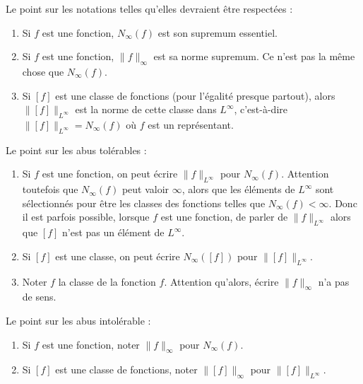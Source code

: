 \begin{normaltext}
    Le point sur les notations telles qu'elles devraient être respectées :
    \begin{enumerate}
        \item
            Si \( f\) est une fonction, \( N_{\infty}(f)\) est son supremum essentiel.
        \item
            Si \( f\) est une fonction, \( \| f \|_{\infty}\) est sa norme supremum. Ce n'est pas la même chose que \( N_{\infty}(f)\).
        \item
            Si \( [f]\) est une classe de fonctions (pour l'égalité presque partout), alors \( \| [f] \|_{L^{\infty}}\) est la norme de cette classe dans \( L^{\infty}\), c'est-à-dire \( \| [f] \|_{L^{\infty}}=N_{\infty}(f)\) où \( f\) est un représentant.
    \end{enumerate}
    Le point sur les abus tolérables :
    \begin{enumerate}
        \item
            Si \( f\) est une fonction, on peut écrire \( \| f \|_{L^{\infty}}\) pour \( N_{\infty}(f)\). Attention toutefois que \( N_{\infty}(f)\) peut valoir \( \infty\), alors que les éléments de \( L^{\infty}\) sont sélectionnés pour être les classes des fonctions telles que \( N_{\infty}(f)<\infty\). Donc il est parfois possible, lorsque \( f\) est une fonction, de parler de \( \| f \|_{L^{\infty}}\) alors que \( [f]\) n'est pas un élément de \( L^{\infty}\).
        \item
            Si \( [f]\) est une classe, on peut écrire \( N_{\infty}([f])\) pour \( \| [f] \|_{L^{\infty}}\).
        \item
            Noter \( f\) la classe de la fonction \( f\). Attention qu'alors, écrire \( \| f \|_{\infty}\) n'a pas de sens.
    \end{enumerate}
    Le point sur les abus intolérable :
    \begin{enumerate}
        \item
            Si \( f\) est une fonction, noter \( \| f \|_{\infty}\) pour \( N_{\infty}(f)\).
        \item
            Si \( [f]\) est une classe de fonctions, noter \( \| [f] \|_{\infty}\) pour \( \| [f] \|_{L^{\infty}}\).
    \end{enumerate}
\end{normaltext}

